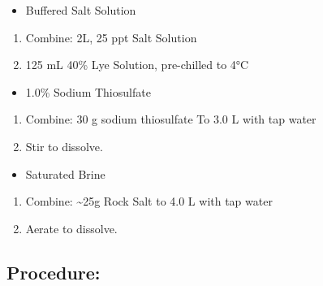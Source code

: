 \documentclass[
]{book}
\providecommand{\tightlist}{%
  \setlength{\itemsep}{0pt}\setlength{\parskip}{0pt}}
\begin{document}
\begin{itemize}
\tightlist
\item
  Buffered Salt Solution
\end{itemize}

\begin{enumerate}
\def\labelenumi{\arabic{enumi}.}
\tightlist
\item
  Combine: 2L, 25 ppt Salt Solution
\item
  125 mL 40\% Lye Solution, pre-chilled to 4°C
\end{enumerate}

\begin{itemize}
\tightlist
\item
  1.0\% Sodium Thiosulfate
\end{itemize}

\begin{enumerate}
\def\labelenumi{\arabic{enumi}.}
\tightlist
\item
  Combine: 30 g sodium thiosulfate To 3.0 L with tap water
\item
  Stir to dissolve.
\end{enumerate}

\begin{itemize}
\tightlist
\item
  Saturated Brine
\end{itemize}

\begin{enumerate}
\def\labelenumi{\arabic{enumi}.}
\tightlist
\item
  Combine: \textasciitilde25g Rock Salt to 4.0 L with tap water
\item
  Aerate to dissolve.
\end{enumerate}

\hypertarget{procedure-5}{%
\subsection{Procedure:}\label{procedure-5}}
\end{document}
